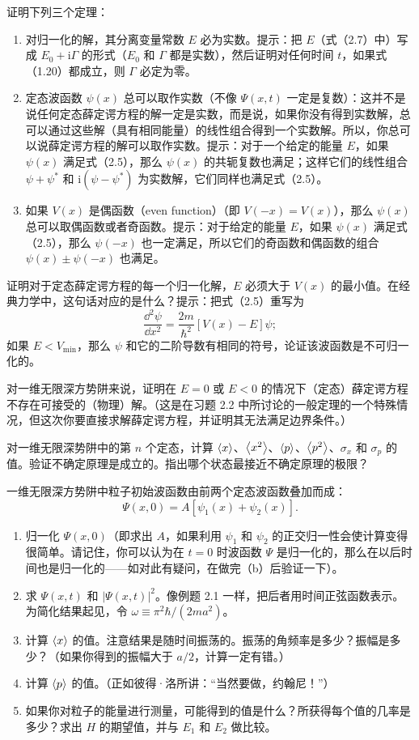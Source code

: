 
证明下列三个定理：
\begin{enumerate}
\item 对归一化的解，其分离变量常数 $E$ 必为实数。提示：把 $E$（式（2.7）中）写成 $E_0+\mathrm{i}\Gamma$ 的形式（$E_0$ 和 $\Gamma$ 都是实数），然后证明对任何时间 $t$，如果式（1.20）都成立，则 $\Gamma$ 必定为零。
\item 定态波函数 $\psi(x)$ 总可以取作实数（不像 $\Psi(x,t)$ 一定是复数）：这并不是说任何定态薛定谔方程的解一定是实数，而是说，如果你没有得到实数解，总可以通过这些解（具有相同能量）的线性组合得到一个实数解。所以，你总可以说薛定谔方程的解可以取作实数。提示：对于一个给定的能量 $E$，如果 $\psi(x)$ 满足式（2.5），那么 $\psi(x)$ 的共轭复数也满足；这样它们的线性组合 $\psi+\psi^*$ 和 $\mathrm{i}(\psi-\psi^*)$ 为实数解，它们同样也满足式（2.5）。
\item 如果 $V(x)$ 是偶函数（even function）（即 $V(-x)=V(x)$），那么 $\psi(x)$ 总可以取偶函数或者奇函数。提示：对于给定的能量 $E$，如果 $\psi(x)$ 满足式（2.5），那么 $\psi(-x)$ 也一定满足，所以它们的奇函数和偶函数的组合 $\psi(x)\pm\psi(-x)$ 也满足。
\end{enumerate}
\vfill

证明对于定态薛定谔方程的每一个归一化解，$E$ 必须大于 $V(x)$ 的最小值。在经典力学中，这句话对应的是什么？提示：把式（2.5）重写为
\[
\frac{\dd^2\psi}{\dd x^2}=\frac{2m}{\hbar^2}[V(x)-E]\psi;
\]
如果 $E<V_{\min}$，那么 $\psi$ 和它的二阶导数有相同的符号，论证该波函数是不可归一化的。
\vfill

对一维无限深方势阱来说，证明在 $E=0$ 或 $E<0$ 的情况下（定态）薛定谔方程不存在可接受的（物理）解。（这是在习题 2.2 中所讨论的一般定理的一个特殊情况，但这次你要直接求解薛定谔方程，并证明其无法满足边界条件。）
\vfill

对一维无限深势阱中的第 $n$ 个定态，计算 $\left\langle x\right\rangle$、$\left\langle x^2\right\rangle$、$\left\langle p\right\rangle$、$\left\langle p^2\right\rangle$、$\sigma_x$ 和 $\sigma_p$ 的值。验证不确定原理是成立的。指出哪个状态最接近不确定原理的极限？
\vfill

一维无限深方势阱中粒子初始波函数由前两个定态波函数叠加而成：
\[
\Psi(x,0)=A[\psi_1(x)+\psi_2(x)].
\]
\begin{enumerate}
\item 归一化 $\Psi(x,0)$（即求出 $A$，如果利用 $\psi_1$ 和 $\psi_2$ 的正交归一性会使计算变得很简单。请记住，你可以认为在 $t=0$ 时波函数 $\Psi$ 是归一化的，那么在以后时间也是归一化的——如对此有疑问，在做完（b）后验证一下）。
\item 求 $\Psi(x,t)$ 和 $|\Psi(x,t)|^2$。像例题 2.1 一样，把后者用时间正弦函数表示。为简化结果起见，令 $\omega\equiv\pi^2\hbar/(2ma^2)$。
\item 计算 $\left\langle x\right\rangle$ 的值。注意结果是随时间振荡的。振荡的角频率是多少？振幅是多少？（如果你得到的振幅大于 $a/2$，计算一定有错。）
\item 计算 $\left\langle p\right\rangle$ 的值。（正如彼得·洛所讲：“当然要做，约翰尼！”）
\item 如果你对粒子的能量进行测量，可能得到的值是什么？所获得每个值的几率是多少？求出 $H$ 的期望值，并与 $E_1$ 和 $E_2$ 做比较。
\end{enumerate}
\vfill

